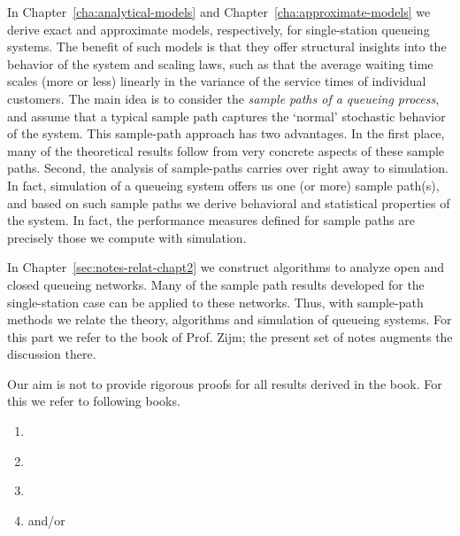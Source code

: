 In Chapter~\ref{cha:analytical-models} and Chapter~\ref{cha:approximate-models} we derive exact and approximate models, respectively, for single-station queueing systems.
The benefit of such models is that they offer structural insights into the behavior of the system and scaling laws, such as that the average waiting time scales (more or less) linearly in the variance of the service times of individual customers.
The main idea is to consider the \emph{sample paths of a queueing process}, and assume that a typical sample path captures the `normal' stochastic behavior of the system.
This sample-path approach has two advantages.
In the first place, many of the theoretical results follow from very concrete aspects of these sample paths.
Second, the analysis of sample-paths carries over right away to simulation.
In fact, simulation of a queueing system offers us one (or more) sample path(s), and based on such sample paths we derive behavioral and statistical properties of the system.
In fact, the performance measures defined for sample paths are precisely those we compute with simulation.


In Chapter~\ref{sec:notes-relat-chapt2}  we construct algorithms to analyze open and closed queueing networks.
Many of the sample path results developed for the single-station case can be applied to these networks.
Thus, with sample-path methods we relate the theory, algorithms and simulation of queueing systems.
For this part we refer to the book of Prof.
Zijm; the present set of notes augments the discussion there.



Our aim is not to provide rigorous proofs for all results derived in the book. For this we refer to following books. 
\begin{enumerate}
\item \citet{bolch06:_queuein_networ_markov_chain}
\item \citet{capinski03:_probab_probl}
\item \citet{el-taha98:_sampl_path_analy_queuein_system}
\item \citet{tijms94:_stoch_model_algor_approac} and/or \citet{tijms03:_first_cours_stoch_model}
\end{enumerate}

